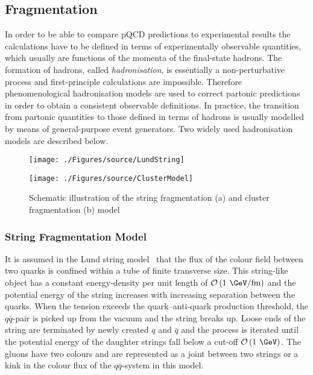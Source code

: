 \subsection{Fragmentation}
\label{subsec:fragmentation}
In order to be able to compare pQCD predictions to experimental results the calculations have to be defined in terms of experimentally observable quantities, which usually are functions of the momenta of the final-state hadrons. The formation of hadrons, called \emph{hadronisation}, is essentially a non-perturbative process and first-principle calculations are impossible. Therefore phenomenological hadronisation models are used to correct partonic predictions in order to obtain a consistent observable definitions. In practice, the transition from partonic quantities to those defined in terms of hadrons is usually modelled by means of general-purpose event generators. Two widely used hadronisation models are described below.
\begin{figure}[t]
	\centering
	\begin{subfloat}[]{
		\texttt{[image: ./Figures/source/LundString]}
		\label{fig:lund}
	 }%
	\end{subfloat}
	\begin{subfloat}[]{
		\texttt{[image: ./Figures/source/ClusterModel]}
		\label{fig:cluster}
	}%
	\end{subfloat}
	\caption{Schematic illustration of the string fragmentation (a) and cluster fragmentation (b) model}
\label{fig:fragmentationmodels}
\end{figure}
\subsubsection{String Fragmentation Model}
It is assumed in the Lund string model~\cite{Andersson:1983ia} that the flux of the colour field between two quarks is confined within a tube of finite transverse size. This string-like object has a constant energy-density per unit length of $\mathcal{O}\left( \text{1 \GeV/fm}\right)$ and the potential energy of the string increases with increasing separation between the quarks. When the tension exceeds the quark--anti-quark production threshold, the $q\bar{q}$-pair is picked up from the vacuum and the string breaks up. Loose ends of the string are terminated by newly created $q$ and $\bar{q}$ and the process is iterated until the potential energy of the daughter strings fall below a cut-off $\mathcal{O}\left( \text{1 \GeV}\right)$. The gluons have two colours and are represented as a joint between two strings or a kink in the colour flux of the $q\bar{q}$-system in this model. 

